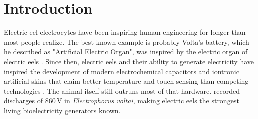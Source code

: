\newpage
\section{Introduction}

Electric eel electrocytes have been inspiring human engineering for longer than most people realize. 
The best known example is probably Volta's battery, which he described as "Artificial Electric Organ", was inspired by the electric organ of electric eels \parencite{volta1800electricity}. 
Since then, electric eels and their ability to generate electricity have inspired the development of modern electrochemical capacitors and iontronic artificial skins that claim better temperature and touch sensing 
than competing technologies \parencite{sun2016electrochemical, pei2025electric}.
The animal itself still outruns most of that hardware.
\textcite{santana2019unexpected} recorded discharges of 860\,V in \textit{Electrophorus voltai}, making electric eels the strongest living bioelectricity generators known.

